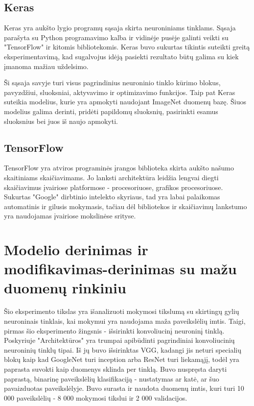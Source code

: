 \documentclass{VUMIFPSkursinis}
\begin{document}
\subsection{Keras}
Keras yra aukšto lygio programų sąsaja skirta neuroniniams tinklams. Sąsaja parašyta su Python programavimo kalba ir vidinėje pusėje galinti veikti su "TensorFlow" 
ir kitomis bibliotekomis. Keras buvo sukurtas tikintis suteikti greitą eksperimentavimą, kad sugalvojus idėją pasiekti rezultato būtų galima su kiek įmanoma mažiau uždelsimo.

Ši sąsaja savyje turi visus pagrindinius neuroninio tinklo kūrimo blokus, pavyzdžiui, sluoksniai, aktyvavimo ir optimizavimo funkcijos. Taip pat Keras suteikia modelius, 
kurie yra apmokyti naudojant ImageNet duomenų bazę. Šiuos modelius galima derinti, pridėti papildomų sluoksnių, pasirinkti esamus sluoksnius bei juos iš naujo apmokyti.

\subsection{TensorFlow}
TensorFlow yra atviros programinės įrangos biblioteka skirta aukšto našumo skaitiniams skaičiavimams. Jo lanksti architektūra leidžia lengvai diegti skaičiavimus įvairiose 
platformose - procesoriuose, grafikos procesoriuose. Sukurtas "Google" dirbtinio intelekto skyriaus, tad yra labai palaikomas automatinis ir gilusis mokymasis, tačiau 
dėl bibliotekos ir skaičiavimų lankstumo yra naudojamas įvairiose mokslinėse srityse.

\section{Modelio derinimas ir modifikavimas-derinimas su mažu duomenų rinkiniu}
Šio eksperimento tikslas yra išanalizuoti mokymosi tikslumą su skirtingų gylių neuroninais tinklais, kai mokymui yra naudojama maža paveikslėlių imtis. Taigi, pirmas 
šio eksperimento žingsnis - išsirinkti konvoliucinį neuroninį tinklą. Poskyriuje "Architektūros" yra trumpai apibūdinti pagrindiniai konvoliucinių neuroninių tinklų tipai. 
Iš jų buvo išsirinktas VGG, kadangi jis neturi specialių blokų kaip kad GoogleNet turi inception arba ResNet turi liekamąjį, todėl yra paprasta suvokti kaip duomenys sklinda per tinklą. Buvo nuspręsta daryti paprastą, binarinę paveikslėlių 
klasifikaciją - nustatymas ar katė, ar šuo pavaizduotas paveikslėlyje. Buvo surasta ir naudota duomenų imtis, kuri turi 10 000 paveikslėlių - 8 000 mokymosi tikslui ir 2 000 validacijos.
\end{document}
